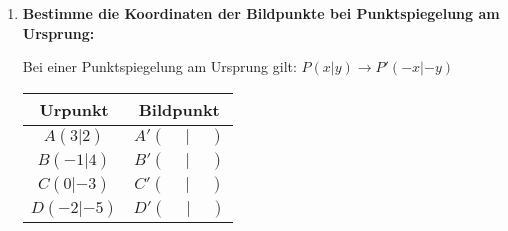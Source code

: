 \begin{enumerate}[label=\arabic*., resume]
    \vspace{1cm}

    \item \textbf{Bestimme die Koordinaten der Bildpunkte bei Punktspiegelung am Ursprung:}

    Bei einer Punktspiegelung am Ursprung gilt: $P(x|y) \rightarrow P'(-x|-y)$

    \vspace{0.5cm}

    \begin{tabular}{|c|c|}
        \hline
        Urpunkt & Bildpunkt \\
        \hline
        $A(3|2)$ & $A'(\phantom{-0}|\phantom{-0})$ \\
        \hline
        $B(-1|4)$ & $B'(\phantom{-0}|\phantom{-0})$ \\
        \hline
        $C(0|-3)$ & $C'(\phantom{-0}|\phantom{-0})$ \\
        \hline
        $D(-2|-5)$ & $D'(\phantom{-0}|\phantom{-0})$ \\
        \hline
    \end{tabular}

\end{enumerate}